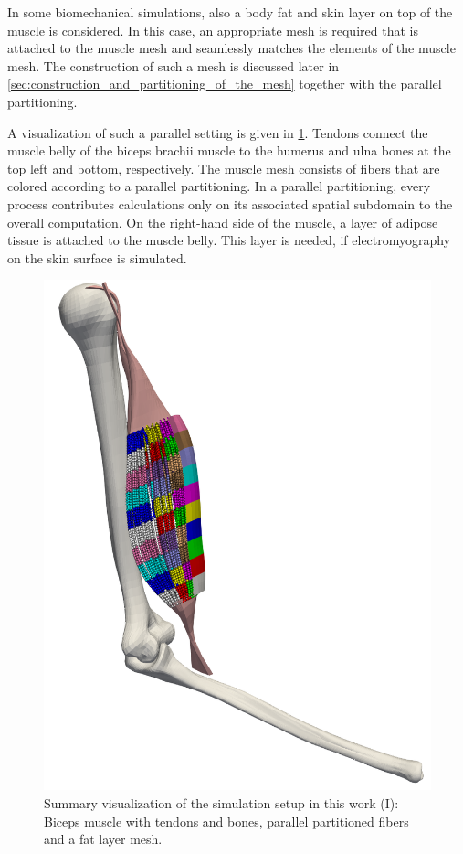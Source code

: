 In some biomechanical simulations, also a body fat and skin layer on top of the muscle is considered. In this case, an appropriate mesh is required that is attached to the muscle mesh and seamlessly matches the elements of the muscle mesh. The construction of such a mesh is discussed later in \cref{sec:construction_and_partitioning_of_the_mesh} together with the parallel partitioning.

A visualization of such a parallel setting is given in \cref{fig:partitioning_biceps}. Tendons connect the muscle belly of the biceps brachii muscle to the humerus and ulna bones at the top left and bottom, respectively. The muscle mesh consists of fibers that are colored according to a parallel partitioning. In a parallel partitioning, every process contributes calculations only on its associated spatial subdomain to the overall computation. On the right-hand side of the muscle, a layer of adipose tissue is attached to the muscle belly. This layer is needed, if electromyography on the skin surface is simulated. 

\begin{figure}
  \centering%
  \includegraphics[width=\textwidth]{images/parallel_fiber_estimation/partitioning_biceps.png}%
  \caption{Summary visualization of the simulation setup in this work (I): Biceps muscle with tendons and bones, parallel partitioned fibers and a fat layer mesh.}%
  \label{fig:partitioning_biceps}%
\end{figure}%

